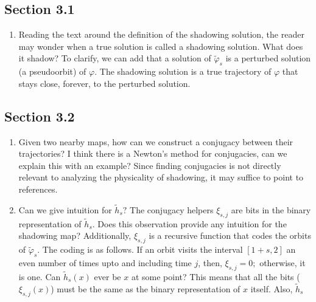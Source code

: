 \documentclass[12pt]{article}
\begin{document}
\subsection*{Section 3.1}
\begin{enumerate}
    \item Reading the text around the definition of the shadowing solution, 
    the reader may wonder when a true solution is called a shadowing solution.
    What does it shadow? To clarify, we can add that a solution of $\tilde{\varphi}_s$
    is a perturbed solution (a pseudoorbit) of $\varphi.$ The shadowing solution 
    is a true trajectory of $\varphi$ that stays close, forever, to the perturbed solution.
\end{enumerate}
\subsection*{Section 3.2}
\begin{enumerate}
    \item Given two nearby maps, how can we construct a conjugacy between their trajectories?
    I think there is a Newton's method for conjugacies, can we explain this with an example?
    Since finding conjugacies is not directly relevant to analyzing the physicality of shadowing, it may suffice to point to references. 
    \item Can we give intuition for $\tilde{h}_s?$ The conjugacy helpers $\xi_{s, j}$
    are bits in the binary representation of $\tilde{h}_s.$ Does this observation provide 
    any intuition for the shadowing map? Additionally, $\xi_{s, j}$ is a recursive function that codes the orbits of $\tilde{\varphi}_s.$ The coding is as follows. If an orbit 
    visits the interval $[1+s, 2]$ an even number of times upto and including time $j$,
    then, $\xi_{s,j} =0;$ otherwise, it is one. Can $\tilde{h}_s(x)$ ever be $x$ at some point? This means that all the bits ($\xi_{s,j}(x)$) must be the same as the binary representation of $x$ itself. Also, $\tilde{h}_s$
\end{enumerate}
\end{document}

